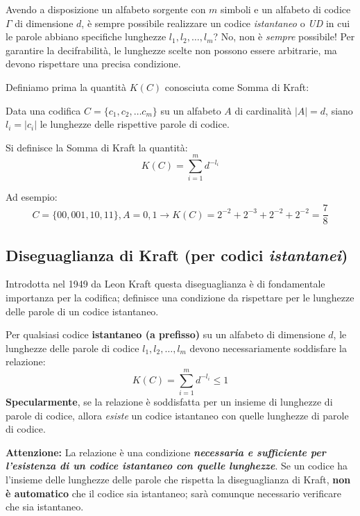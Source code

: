Avendo a disposizione un alfabeto sorgente con $m$ simboli e un alfabeto di codice $\Gamma$ di dimensione $d$, è sempre possibile realizzare un codice \textit{istantaneo} o \textit{UD} in cui le parole abbiano specifiche lunghezze $l_1, l_2, \dots, l_m$?
No, non è \textit{sempre} possibile! Per garantire la decifrabilità, le lunghezze scelte non possono essere arbitrarie, ma devono rispettare una precisa condizione.

Definiamo prima la quantità $K(C)$ conosciuta come Somma di Kraft:

\begin{definition}

    Data una codifica $C = \{c_1,c_2,\dots c_m\}$ su un alfabeto $A$ di cardinalità $|A|= d$, siano $l_i = |c_i|$ le lunghezze delle rispettive parole di codice.
    
    Si definisce la Somma di Kraft la quantità:
    \[K(C)= \sum_{i=1}^m d^{-l_i}\]
\end{definition}
Ad esempio:
\[C=\{00, 001,10,11\},A={0,1} \rightarrow K(C)= 2^{-2}+2^{-3}+2^{-2}+2^{-2}= \frac{7}{8}\]

\subsection{Diseguaglianza di Kraft (per codici \textit{istantanei})}
Introdotta nel 1949 da Leon Kraft questa diseguaglianza è di fondamentale importanza per la codifica; definisce una condizione da rispettare per le lunghezze delle parole di un codice istantaneo.

\begin{theorem}
Per qualsiasi codice \textbf{istantaneo (a prefisso)} su un alfabeto di dimensione $d$, le lunghezze delle parole di codice $l_1, l_2, \dots, l_m$ devono necessariamente soddisfare la relazione:
\[K(C)= \sum_{i=1}^m d^{-l_i} \leq 1\]
\textbf{Specularmente}, se la relazione è soddisfatta per un insieme di lunghezze di parole di codice, allora \textit{esiste} un codice istantaneo con quelle lunghezze di parole di codice.
\end{theorem}
 
\textbf{Attenzione:} La relazione è una condizione \textbf{\textit{necessaria e sufficiente per l'esistenza di un codice istantaneo con quelle lunghezze}}. Se un codice ha l'insieme delle lunghezze delle parole che rispetta la diseguaglianza di Kraft, \textbf{non è automatico} che il codice sia istantaneo; sarà comunque necessario verificare che sia istantaneo.


